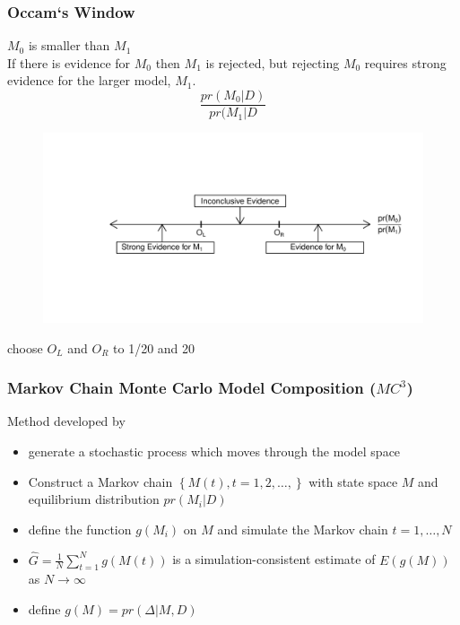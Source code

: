 \documentclass[hyperref={pdfpagelabels=true}]{beamer}
\begin{document}
\begin{frame}
\frametitle{Occam`s Window}
$M_{0}$ is smaller than $M_{1}$\\
If there is evidence for $M_{0}$ then $M_{1}$ is rejected, but
rejecting $M_{0}$ requires strong evidence for the larger
model, $M_{1}$.
\[
\frac{pr(M_{0}|D)}{pr(M_{1}|D}
\]
\begin{figure}
	\centering
		\includegraphics[width=1.00\textwidth]{OccamsWindow}
	\label{fig:OccamsWindow}
\end{figure}
choose $O_{L}$ and $O_{R}$ to 1/20 and 20
\end{frame}

\begin{frame}
\frametitle{Markov Chain Monte Carlo Model Composition ($MC^{3}$)}
Method developed by \cite{Madigan.1995}
\begin{itemize}
\item generate a stochastic process which moves through the model space 
\item Construct a Markov chain $\left\{M(t),t=1,2,\ldots,\right\}$ with state space $M$ and equilibrium distribution $pr(M_{i}|D)$
\item define the function $g(M_{i})$ on $M$ and simulate the Markov chain $t=1,\ldots,N$
\item $\hat{G}=\frac{1}{N}\sum_{t=1}^{N}g(M(t))$ is a simulation-consistent estimate of $E(g(M))$ as $N \rightarrow\infty$
\item define $g(M)=pr(\Delta|M,D)$
\end{itemize}
\end{frame}
\end{document}
